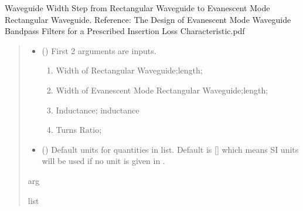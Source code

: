 \documentclass[letterpaper,10pt,english]{sphinxmanual}
\begin{document}

\begin{fulllineitems}
\label{\detokenize{components:components.RectWG2EvanescentRectWGStep}}
\pysigstartsignatures
{}
\pysigstopsignatures
\sphinxAtStartPar
Waveguide Width Step from Rectangular Waveguide to Evanescent Mode Rectangular Waveguide.
Reference:  The Design of Evanescent Mode Waveguide Bandpass Filters for a Prescribed Insertion Loss Characteristic.pdf
\begin{quote}\begin{description}
\begin{itemize}
\item {}
\sphinxAtStartPar
{} () \textendash{}
\sphinxAtStartPar
First 2 arguments are inputs.
\begin{enumerate}
%
\item {}
\sphinxAtStartPar
Width of Rectangular Waveguide;length;

\item {}
\sphinxAtStartPar
Width of Evanescent Mode Rectangular Waveguide;length;

\item {}
\sphinxAtStartPar
Inductance; inductance

\item {}
\sphinxAtStartPar
Turns Ratio;

\end{enumerate}


\item {}
\sphinxAtStartPar
{} (\sphinxstyleliteralemphasis{\sphinxupquote{, }}) \textendash{} Default units for quantities in  list. Default is {[}{]} which means SI units will be used if no unit is given in .

\end{itemize}

\sphinxAtStartPar
arg

\sphinxAtStartPar
list

\end{description}\end{quote}

\end{fulllineitems}
\end{document}
